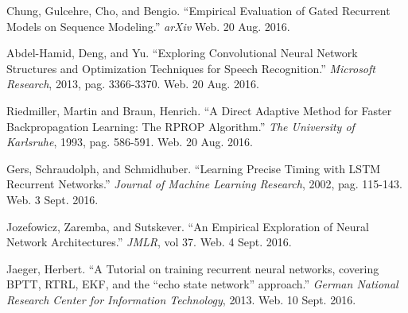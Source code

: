 \documentclass{article}
\begin{document}
\begin{thebibliography}{9}
		Chung, Gulcehre, Cho, and Bengio. ``Empirical Evaluation of Gated
		Recurrent Models on Sequence Modeling.'' \textit{arXiv} Web. 20 Aug.
		2016.

		Abdel-Hamid, Deng, and Yu. ``Exploring Convolutional Neural Network
		Structures and Optimization Techniques for Speech Recognition.''
		\textit{Microsoft Research}, 2013, pag. 3366-3370. Web. 20 Aug. 2016.

		Riedmiller, Martin and Braun, Henrich. ``A Direct Adaptive Method for
		Faster Backpropagation Learning: The RPROP Algorithm.'' \textit{The
		University of Karlsruhe}, 1993, pag. 586-591. Web. 20 Aug. 2016.

		Gers, Schraudolph, and Schmidhuber. ``Learning Precise Timing with LSTM
		Recurrent Networks.'' \textit{Journal of Machine Learning Research},
		2002, pag. 115-143. Web. 3 Sept. 2016.

		Jozefowicz, Zaremba, and Sutskever. ``An Empirical Exploration of Neural
		Network Architectures.'' \textit{JMLR}, vol 37. Web. 4 Sept. 2016.

		Jaeger, Herbert. ``A Tutorial on training recurrent neural networks,
		covering BPTT, RTRL, EKF, and the ``echo state network''
		approach.'' \textit{German National Research Center for Information
		Technology}, 2013. Web. 10 Sept. 2016.
\end{thebibliography}
\end{document}
